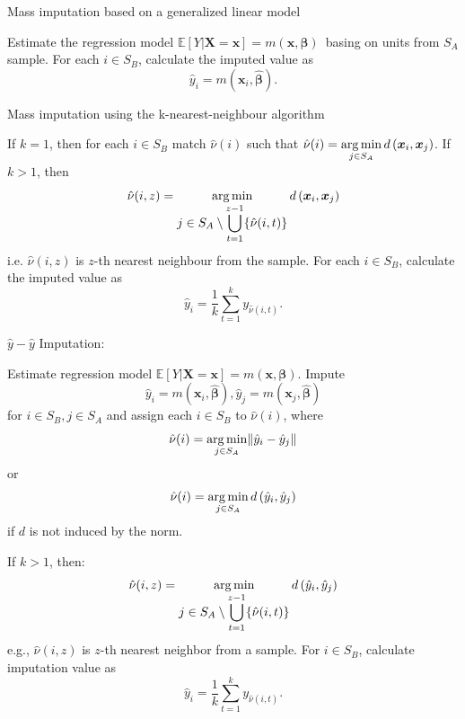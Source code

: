 \documentclass[
]{jss}
\begin{document}
\begin{algorithm}[ht!]
\caption{Mass imputation based on a generalized linear model}
\label{algo-1}
\begin{algorithmic}[1]
 \State Estimate the regression model $\mathbb{E}[Y|\boldsymbol{X}=\boldsymbol{x}]=m(\boldsymbol{x}, \boldsymbol{\beta})$\ basing on units from $S_A$ sample.
 \State For each $i \in S_B$, calculate the imputed value as
 $$
 \hat{y}_i = m\left(\boldsymbol{x}_{i},\hat{\boldsymbol{\beta}}\right).
 $$
\end{algorithmic}
\end{algorithm}

\begin{algorithm}[ht!]
\caption{Mass imputation using the k-nearest-neighbour algorithm}
\label{algo-2}
\begin{algorithmic}[1]
\State If $k=1$, then for each $i \in S_B$ match $\hat{\nu}(i)$ such that
$\displaystyle \hat{\nu}(i)=
\operatornamewithlimits{arg\,min}_{j\in S_{A}}d\left(\boldsymbol{x}_i,\boldsymbol{x}_j\right)$.
\State If $k>1$, then
$$\hat{\nu}(i, z) = \operatornamewithlimits{arg\,min}_{\displaystyle j\in S_{A}\setminus\bigcup_{t=1}^{z-1}
\{\hat{\nu}(i, t)\}} d\left(\boldsymbol{x}_i, \boldsymbol{x}_j\right)$$
i.e. $\hat{\nu}(i, z)$ is $z$-th nearest neighbour from the sample.\;
\State For each $i \in S_B$, calculate the imputed value as
$$
\hat{y}_i = \frac{1}{k}\sum_{t=1}^{k}y_{\hat{\nu}(i, t)}.
$$
\end{algorithmic}
\end{algorithm}

\begin{algorithm}[ht!]
\caption{$\hat{y}-\hat{y}$ Imputation:}
\label{algo-3}
\begin{algorithmic}[1]
\State Estimate regression model $\mathbb{E}[Y|\boldsymbol{X}=\boldsymbol{x}]=m(\boldsymbol{x}, \boldsymbol{\beta})$.\;
\State Impute $$\hat{y}_{i}=m\left(\boldsymbol{x}_{i},\hat{\boldsymbol{\beta}}\right), 
\hat{y}_{j}=m\left(\boldsymbol{x}_{j},\hat{\boldsymbol{\beta}}\right)$$
for $i\in S_{B}, j\in S_{A}$ and assign each 
$i\in S_{B}$ to $\hat{\nu}(i)$, where
$$\displaystyle \hat{\nu}(i)=
\operatornamewithlimits{arg\,min}_{j\in S_{A}}\lVert \hat{y}_{i}-\hat{y}_{j}\rVert$$ or
$$\displaystyle \hat{\nu}(i)=
\operatornamewithlimits{arg\,min}_{j\in S_{A}}d\left(\hat{y}_{i},\hat{y}_{j}\right)$$ if $d$ is not induced by the norm.\;

\State If $k>1$, then:
$$\hat{\nu}(i, z) = \operatornamewithlimits{arg\,min}_{\displaystyle j\in S_{A}\setminus\bigcup_{t=1}^{z-1}
\{\hat{\nu}(i, t)\}} d\left(\hat{y}_{i},\hat{y}_{j}\right)$$
e.g., $\hat{\nu}(i, z)$ is $z$-th nearest neighbor from a sample.\;
\State For $i \in S_B$, calculate imputation value as 
$$
\hat{y}_i = \frac{1}{k}\sum_{t=1}^{k}y_{\hat{\nu}(i, t)}.
$$
\end{algorithmic}
\end{algorithm}
\end{document}
